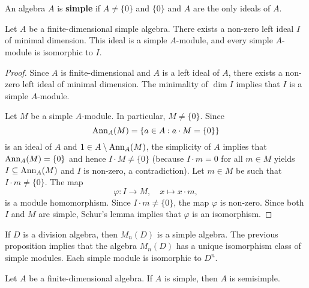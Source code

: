 \chapter{}
\label{03}

\begin{definition}
    An algebra $A$ is \textbf{simple} if $A\ne\{0\}$ and $\{0\}$ and $A$ are the only ideals of $A$. 
\end{definition}

\begin{proposition}
	Let $A$ be a finite-dimensional simple algebra. There exists a non-zero left ideal 
	$I$ of minimal dimension. This ideal is a simple 
	$A$-module, and every simple $A$-module is isomorphic to $I$.
\end{proposition}

\begin{proof}
	Since $A$ is finite-dimensional and $A$ is a left ideal of $A$, there exists a non-zero left ideal of minimal dimension. The minimality 
	of $\dim I$ implies that $I$ is a simple $A$-module. 
	
	Let $M$ be a simple $A$-module. In particular, $M\ne\{0\}$. 
	Since  
	\[
	\operatorname{Ann}_A(M)=\{a\in A:a\cdot M=\{0\}\}
	\]
	is an ideal of $A$ and $1\in A\setminus\operatorname{Ann}_A(M)$, the simplicity of $A$ implies that 
	$\operatorname{Ann}_A(M)=\{0\}$ and hence $I\cdot M\ne\{0\}$ (because $I\cdot m= 0$ for all $m\in M$ yields  
	$I\subseteq\operatorname{Ann}_A(M)$ and $I$ is non-zero, a contradiction). Let $m\in M$ be such 
	that $I\cdot m\ne\{0\}$. The map 
	\[
	\varphi\colon I\to M,\quad
	x\mapsto x\cdot m,
	\]
	is a module homomorphism. Since $I\cdot m\ne\{0\}$, the map $\varphi$ is non-zero. 
	Since both $I$ and $M$ are simple, Schur's lemma implies that $\varphi$ is an isomorphism. 
\end{proof}

If $D$ is a division algebra, then $M_n(D)$ is a simple algebra. The previous proposition
implies that the algebra $M_n(D)$ has a unique isomorphism class of simple modules. Each simple module
is isomorphic to $D^n$. 

\begin{proposition}
    Let $A$ be a finite-dimensional algebra. 
    If $A$ is simple, then $A$ is semisimple. 
\end{proposition}

